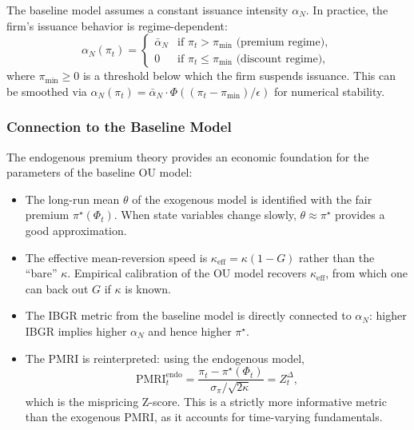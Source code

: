 The baseline model assumes a constant issuance intensity $\alpha_N$.  In
practice, the firm's issuance behavior is regime-dependent:
\begin{equation}
  \label{eq:regime_issuance}
  \alpha_N(\pi_t) =
  \begin{cases}
    \bar{\alpha}_N & \text{if } \pi_t > \pi_{\min} \text{ (premium regime)}, \\
    0              & \text{if } \pi_t \le \pi_{\min} \text{ (discount regime)},
  \end{cases}
\end{equation}
where $\pi_{\min} \ge 0$ is a threshold below which the firm suspends
issuance.  This can be smoothed via
$\alpha_N(\pi_t) = \bar{\alpha}_N \cdot \Phi((\pi_t - \pi_{\min})/\epsilon)$
for numerical stability.

\subsubsection{Connection to the Baseline Model}
\label{sec:connection}

The endogenous premium theory provides an economic foundation for the
parameters of the baseline OU model:
\begin{itemize}
  \item The long-run mean $\theta$ of the exogenous model is identified with
        the fair premium $\pi^\star(\Phi_t)$.  When state variables change
        slowly, $\theta \approx \pi^\star$ provides a good approximation.
  \item The effective mean-reversion speed is $\kappa_{\mathrm{eff}} = \kappa(1-G)$
        rather than the ``bare'' $\kappa$.  Empirical calibration of the OU
        model recovers $\kappa_{\mathrm{eff}}$, from which one can back out $G$
        if $\kappa$ is known.
  \item The IBGR metric from the baseline model is directly connected to
        $\alpha_N$: higher IBGR implies higher $\alpha_N$ and hence higher
        $\pi^\star$.
  \item The PMRI is reinterpreted: using the endogenous model,
        \begin{equation}
          \label{eq:pmri_endo}
          \mathrm{PMRI}_t^{\mathrm{endo}}
          = \frac{\pi_t - \pi^\star(\Phi_t)}{\sigma_\pi/\sqrt{2\kappa}}
          = Z_t^\Delta,
        \end{equation}
        which is the mispricing Z-score.  This is a strictly more informative
        metric than the exogenous PMRI, as it accounts for time-varying
        fundamentals.
\end{itemize}

